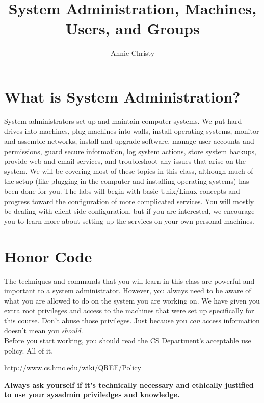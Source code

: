 \documentclass{article}
\title{System Administration, Machines, Users, and Groups\vspace{-2ex}}
\author{Annie Christy}
\date{}
\begin{document}
\maketitle

\section*{What is System Administration?}

System administrators set up and maintain computer systems. We put hard drives
into machines, plug machines into walls, install operating systems, monitor and
assemble networks, install and upgrade software, manage user accounts and
permissions,  guard secure information, log system actions, store system
backups, provide web and email services, and troubleshoot any issues that arise
on the system. We will be covering most of these topics in this class, although
much of the setup (like plugging in the computer and installing operating
systems) has been done for you. The labs will begin with basic Unix/Linux
concepts and progress toward the configuration of more complicated services. You
will mostly be dealing with client-side configuration, but if you are
interested, we encourage you to learn more about setting up the services on your
own personal machines.

\section*{Honor Code} The techniques and commands that you will learn in this
class are powerful and important to a system administrator. However, you always
need to be aware of what you are allowed to do on the system you are working on.
We have given you extra root privileges and access to the machines that were set
up specifically for this course. Don't abuse those privileges. 
Just because you \textit{can} access information doesn't mean you \textit{should}.
\\

\noindent Before you start working, you should read the CS Department's
acceptable use policy. All of it.

\vspace{1em}

\url{http://www.cs.hmc.edu/wiki/QREF/Policy}

\vspace{1em}

\noindent\textbf{Always ask yourself if it's technically necessary and 
ethically justified to use your sysadmin priviledges and knowledge.}
\end{document}

